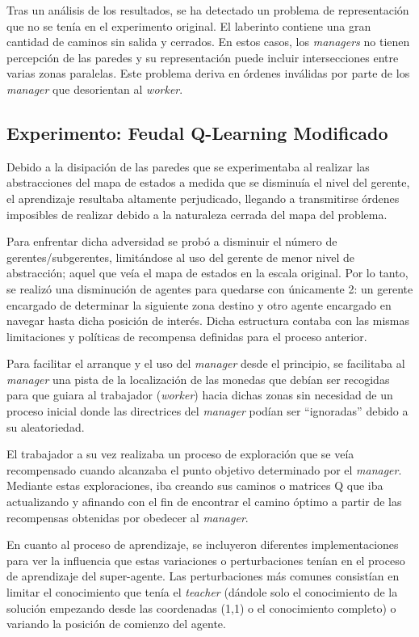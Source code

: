 \documentclass[letterpaper]{article} %
\begin{document}
Tras un análisis de los resultados, se ha detectado un problema de representación que no se tenía en el experimento original. El laberinto contiene 
una gran cantidad de caminos sin salida y cerrados. En estos casos, los \textit{managers} no tienen percepción de las paredes y su representación puede incluir
intersecciones entre varias zonas paralelas. Este problema deriva en órdenes inválidas por parte de los \textit{manager} que desorientan al \textit{worker}. 

\subsection{Experimento: Feudal Q-Learning Modificado}

Debido a la disipación de las paredes que se experimentaba al realizar las abstracciones del mapa de estados a medida que se disminuía
el nivel del gerente, el aprendizaje resultaba altamente perjudicado, llegando a transmitirse órdenes imposibles de realizar debido a la
naturaleza cerrada del mapa del problema.

Para enfrentar dicha adversidad se probó a disminuir el número de gerentes/subgerentes, limitándose al uso del gerente de menor nivel
de abstracción; aquel que veía el mapa de estados en la escala original. Por lo tanto, se realizó una disminución de agentes para 
quedarse con únicamente 2: un gerente encargado de determinar la siguiente zona destino y otro agente encargado en navegar hasta 
dicha posición de interés. Dicha estructura contaba con las mismas limitaciones y políticas de recompensa definidas para el proceso anterior.

Para facilitar el arranque y el uso del \textit{manager} desde el principio, se facilitaba al \textit{manager} una pista de la localización de las monedas que 
debían ser recogidas para que guiara al trabajador (\textit{worker}) hacia dichas zonas sin necesidad de un proceso inicial donde las directrices del
\textit{manager} podían ser “ignoradas” debido a su aleatoriedad. 

El trabajador a su vez realizaba un proceso de exploración que se veía recompensado cuando alcanzaba el punto objetivo determinado por el \textit{manager}.
Mediante estas exploraciones, iba creando sus caminos o matrices Q que iba actualizando y afinando con el fin de encontrar el camino óptimo a
partir de las recompensas obtenidas por obedecer al \textit{manager}.

En cuanto al proceso de aprendizaje, se incluyeron diferentes implementaciones para ver la influencia que estas variaciones o perturbaciones
tenían en el proceso de aprendizaje del super-agente. Las perturbaciones más comunes consistían en limitar el conocimiento que tenía el 
\textit{teacher} (dándole solo el conocimiento de la solución empezando desde las coordenadas (1,1) o el conocimiento completo) o variando la posición
de comienzo del agente.
\end{document}
